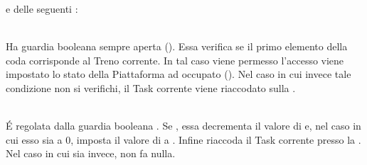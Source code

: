 	e delle seguenti :
	\begin{description}
		\item {}\\
		Ha guardia booleana sempre aperta (). Essa verifica se il primo elemento della coda corrisponde al Treno corrente. In tal caso viene permesso l'accesso viene impostato lo stato della Piattaforma ad occupato (). Nel caso in cui invece tale condizione non si verifichi, il Task corrente viene riaccodato sulla  .	
		
		\item {}\\
		\'E regolata dalla guardia booleana . Se , essa decrementa il valore di  e, nel caso in cui esso sia a 0, imposta il valore di  a . Infine riaccoda il Task corrente presso la  . Nel caso in cui  sia  invece, non fa nulla.
		
	\end{description}
	
	
